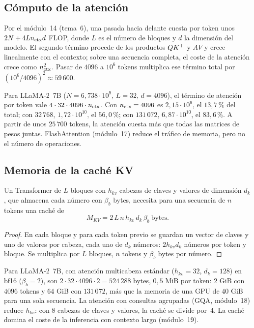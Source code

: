 \subsection*{Cómputo de la atención}

Por el módulo~14 (tema~6), una pasada hacia delante cuesta por token unos $2N+4Ln_{\mathrm{ctx}} d$ FLOP, donde $L$ es el número de bloques y $d$ la dimensión del modelo. El segundo término procede de los productos $QK^{\top}$ y $AV$ y crece linealmente con el contexto; sobre una secuencia completa, el coste de la atención crece como $n_{\mathrm{ctx}}^{2}$. Pasar de $4096$ a $10^{6}$ tokens multiplica ese término total por $(10^{6}/4096)^{2}\approx 59\,600$.

\begin{ejemplo}\label{ej:atencion-larga}
Para LLaMA-2~7B ($N=6{,}738\cdot 10^{9}$, $L=32$, $d=4096$), el término de atención por token vale $4\cdot 32\cdot 4096\cdot n_{\mathrm{ctx}}$. Con $n_{\mathrm{ctx}}=4096$ es $2{,}15\cdot 10^{9}$, el $13{,}7\,\%$ del total; con $32\,768$, $1{,}72\cdot 10^{10}$, el $56{,}0\,\%$; con $131\,072$, $6{,}87\cdot 10^{10}$, el $83{,}6\,\%$. A partir de unos $25\,700$ tokens, la atención cuesta más que todas las matrices de pesos juntas. FlashAttention (módulo~17) reduce el tráfico de memoria, pero no el número de operaciones.
\end{ejemplo}

\subsection*{Memoria de la caché KV}

\begin{proposicion}\label{prop:kv}
Un Transformer de $L$ bloques con $h_{kv}$ cabezas de claves y valores de dimensión $d_k$, que almacena cada número con $\beta_b$ bytes, necesita para una secuencia de $n$ tokens una caché de
\[
M_{KV}=2\,L\,n\,h_{kv}\,d_k\,\beta_b\ \text{bytes}.
\]
\end{proposicion}

\begin{proof}
En cada bloque y para cada token previo se guardan un vector de claves y uno de valores por cabeza, cada uno de $d_k$ números: $2h_{kv}d_k$ números por token y bloque. Se multiplica por $L$ bloques, $n$ tokens y $\beta_b$ bytes por número.
\end{proof}

Para LLaMA-2~7B, con atención multicabeza estándar ($h_{kv}=32$, $d_k=128$) en bf16 ($\beta_b=2$), son $2\cdot 32\cdot 4096\cdot 2=524\,288$ bytes, $0{,}5$ MiB por token: $2$ GiB con $4096$ tokens y $64$ GiB con $131\,072$, más que la memoria de una GPU de $40$ GiB para una sola secuencia. La atención con consultas agrupadas (GQA, módulo~18) reduce $h_{kv}$: con $8$ cabezas de claves y valores, la caché se divide por~$4$. La caché domina el coste de la inferencia con contexto largo (módulo~19).

